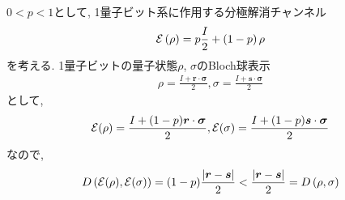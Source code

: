 \begin{ex}
    \label{ex9.12}
    $0 < p < 1$として, 1量子ビット系に作用する分極解消チャンネル
    \begin{align*}
        \mathcal{E} \left( \rho\right) = p \frac{I}{2} + \left(1-p\right)\rho
    \end{align*}
    を考える. 1量子ビットの量子状態$\rho$, $\sigma$のBloch球表示
    \begin{align*}
        \rho = \frac{I + \bm{r} \cdot \bm{\sigma}}{2},
        \sigma = \frac{I + \bm{s} \cdot \bm{\sigma}}{2}
    \end{align*}
    として,
    \begin{align*}
        \mathcal{E}(\rho)
        =
        \frac{I + (1-p)\bm{r}\cdot\bm{\sigma}}{2},
        \mathcal{E}(\sigma)
        =
        \frac{I + (1-p)\bm{s}\cdot\bm{\sigma}}{2}
    \end{align*}
    なので,
    \begin{align*}
        D \left( \mathcal{E}(\rho), \mathcal{E}(\sigma)\right)
        = (1-p)\frac{\left| \bm{r}- \bm{s} \right|}{2}
        <\frac{\left| \bm{r}- \bm{s} \right|}{2}
        = D \left( \rho, \sigma\right)
    \end{align*}
\end{ex}

